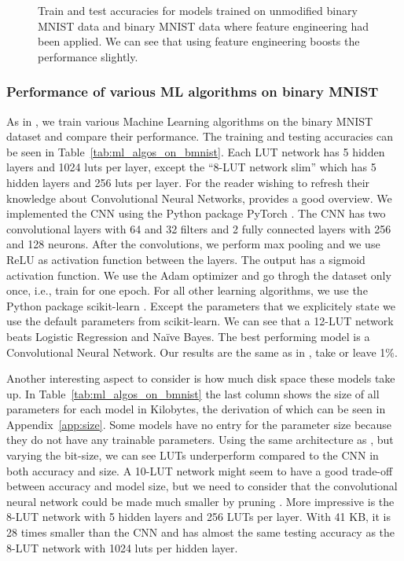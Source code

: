 \begin{figure}[!htb]
    \centering
    
    \caption{Train and test accuracies for models trained on unmodified binary MNIST data and binary MNIST data where feature engineering had been applied. We can see that using feature engineering boosts the performance slightly.}
\label{fig:sobel_acc}
\end{figure}
\FloatBarrier

\subsubsection{Performance of various ML algorithms on binary MNIST} \label{sec:models}
As in \cite{chatterjee2018learning}, we train various Machine Learning algorithms on the binary MNIST dataset and compare their performance. The training and testing accuracies can be seen in Table~\ref{tab:ml_algos_on_bmnist}. Each LUT network has 5 hidden layers and 1024 luts per layer, except the \enquote{8-LUT network slim} which has 5 hidden layers and 256 luts per layer. For the reader wishing to refresh their knowledge about Convolutional Neural Networks, \cite{yamashita2018convolutional} provides a good overview. We implemented the CNN using the Python package PyTorch \cite{NEURIPS2019-9015}. The CNN has two convolutional layers with 64 and 32 filters and 2 fully connected layers with 256 and 128 neurons. After the convolutions, we perform max pooling and we use ReLU as activation function between the layers. The output has a sigmoid activation function. We use the Adam optimizer and go throgh the dataset only once, i.e., train for one epoch. For all other learning algorithms, we use the Python package scikit-learn \cite{scikit-learn}. Except the parameters that we explicitely state we use the default parameters from scikit-learn. We can see that a 12-LUT network beats Logistic Regression and Naïve Bayes. The best performing model is a Convolutional Neural Network. Our results are the same as in \cite{chatterjee2018learning}, take or leave 1\%.

Another interesting aspect to consider is how much disk space these models take up. In Table~\ref{tab:ml_algos_on_bmnist} the last column shows the size of all parameters for each model in Kilobytes, the derivation of which can be seen in Appendix~\ref{app:size}. Some models have no entry for the parameter size because they do not have any trainable parameters. Using the same architecture as \cite{chatterjee2018learning}, but varying the bit-size, we can see LUTs underperform compared to the CNN in both accuracy and size. A 10-LUT network might seem to have a good trade-off between accuracy and model size, but we need to consider that the convolutional neural network could be made much smaller by pruning \cite{molchanov2016pruning}. More impressive is the 8-LUT network with 5 hidden layers and 256 LUTs per layer. With 41 KB, it is 28 times smaller than the CNN and has almost the same testing accuracy as the 8-LUT network with 1024 luts per hidden layer.

